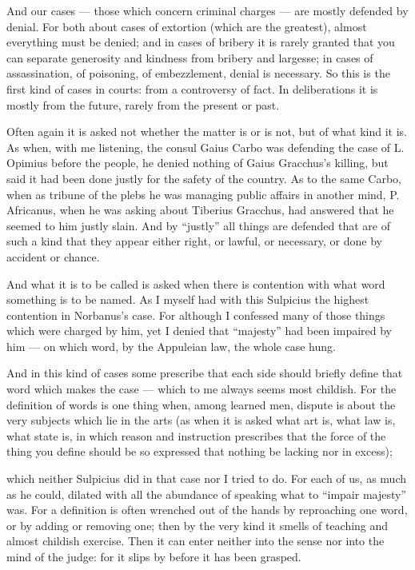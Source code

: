  And our cases — those which concern criminal charges — are mostly defended by denial. For both about cases of extortion (which are the greatest), almost everything must be denied; and in cases of bribery it is rarely granted that you can separate generosity and kindness from bribery and largesse; in cases of assassination, of poisoning, of embezzlement, denial is necessary. So this is the first kind of cases in courts: from a controversy of fact. In deliberations it is mostly from the future, rarely from the present or past.

 Often again it is asked not whether the matter is or is not, but of what kind it is. As when, with me listening, the consul Gaius Carbo was defending the case of L. Opimius before the people, he denied nothing of Gaius Gracchus's killing, but said it had been done justly for the safety of the country. As to the same Carbo, when as tribune of the plebs he was managing public affairs in another mind, P. Africanus, when he was asking about Tiberius Gracchus, had answered that he seemed to him justly slain. And by ``justly'' all things are defended that are of such a kind that they appear either right, or lawful, or necessary, or done by accident or chance.

 And what it is to be called is asked when there is contention with what word something is to be named. As I myself had with this Sulpicius the highest contention in Norbanus's case. For although I confessed many of those things which were charged by him, yet I denied that ``majesty'' had been impaired by him — on which word, by the Appuleian law, the whole case hung.

 And in this kind of cases some prescribe that each side should briefly define that word which makes the case — which to me always seems most childish. For the definition of words is one thing when, among learned men, dispute is about the very subjects which lie in the arts (as when it is asked what art is, what law is, what state is, in which reason and instruction prescribes that the force of the thing you define should be so expressed that nothing be lacking nor in excess);

 which neither Sulpicius did in that case nor I tried to do. For each of us, as much as he could, dilated with all the abundance of speaking what to ``impair majesty'' was. For a definition is often wrenched out of the hands by reproaching one word, or by adding or removing one; then by the very kind it smells of teaching and almost childish exercise. Then it can enter neither into the sense nor into the mind of the judge: for it slips by before it has been grasped.

